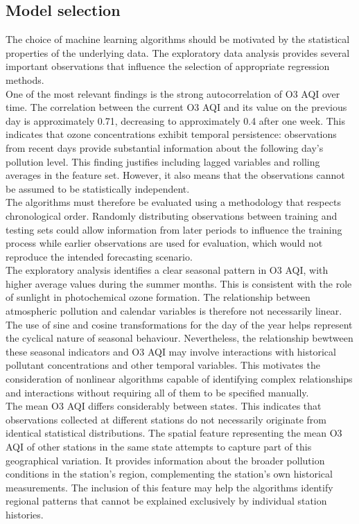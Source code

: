 \documentclass[11pt,a4paper]{article}
\begin{document}
\subsection{Model selection}
The choice of machine learning algorithms should be motivated by the statistical properties of the underlying data. The exploratory data analysis provides several important observations that influence the selection of appropriate regression methods.\\

\noindent
One of the most relevant findings is the strong autocorrelation of O3 AQI over time. The correlation between the current O3 AQI and its value on the previous day is approximately 0.71, decreasing to approximately 0.4 after one week. This indicates that ozone concentrations exhibit temporal persistence: observations from recent days provide substantial information about the following day's pollution level. This finding justifies including lagged variables and rolling averages in the feature set. However, it also means that the observations cannot be assumed to be statistically independent.\\

\noindent
The algorithms must therefore be evaluated using a methodology that respects chronological order. Randomly distributing observations between training and testing sets could allow information from later periods to influence the training process while earlier observations are used for evaluation, which would not reproduce the intended forecasting scenario.\\

\noindent
The exploratory analysis identifies a clear seasonal pattern in O3 AQI, with higher average values during the summer months. This is consistent with the role of sunlight in photochemical ozone formation. The relationship between atmospheric pollution and calendar variables is therefore not necessarily linear. The use of sine and cosine transformations for the day of the year helps represent the cyclical nature of seasonal behaviour. Nevertheless, the relationship bewtween these seasonal indicators and O3 AQI may involve interactions with historical pollutant concentrations and other temporal variables. This motivates the consideration of nonlinear algorithms capable of identifying complex relationships and interactions without requiring all of them to be specified manually.\\

\noindent
The mean O3 AQI differs considerably between states. This indicates that observations collected at different stations do not necessarily originate from identical statistical distributions. The spatial feature representing the mean O3 AQI of other stations in the same state attempts to capture part of this geographical variation. It provides information about the broader pollution conditions in the station's region, complementing the station's own historical measurements. The inclusion of this feature may help the algorithms identify regional patterns that cannot be explained exclusively by individual station histories.\\
\end{document}
